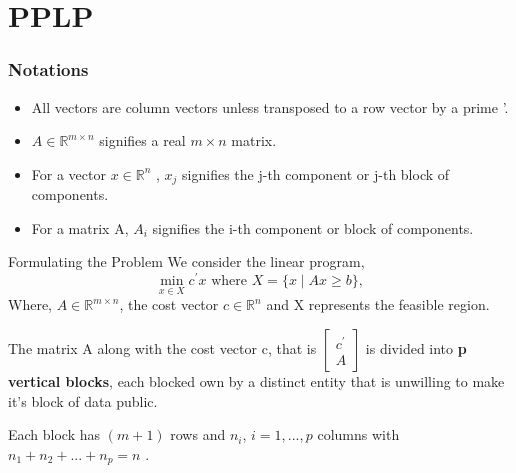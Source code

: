 \documentclass[9pt]{beamer}
\begin{document}
\section{PPLP}

\begin{frame}
\frametitle{Notations}
\begin{itemize}
    \item All vectors are column vectors unless transposed to a row vector by a prime '.
    
    \vspace{0.1cm}
    \item $ A \in \mathbb{R}^{m \times n} $ signifies a real $ m \times n $ matrix.
    
    \vspace{0.1cm}
    \item For a vector $ x \in \mathbb{R}^{n} $ , $ x_j $ signifies the j-th component or j-th block of components.
    
    \vspace{0.1cm}
    \item For a matrix A, $ A_i $ signifies the i-th component or block of components.
\end{itemize}
\end{frame}

\begin{frame}{Formulating the Problem}
We consider the linear program,
\begin{equation}
\min _{x \in X} c^{\prime} x \text { where } X=\{x \mid A x \geq b\},
\end{equation}
\vspace{0.1cm}
Where, $ A \in \mathbb{R}^{m \times n} $, the cost vector $ c \in \mathbb{R}^{n} $ and X represents the feasible region. \\
\vspace{0.3cm}

The matrix A along with the cost vector c, that is $
\left[\begin{array}{l}
c^{\prime} \\
A
\end{array}\right]
$ is divided into \textbf{p vertical blocks}, each blocked own by a distinct entity that is unwilling to make it's block of data public.\\
\vspace{0.2cm}

Each block has $ (m+1) $ rows and $ n_i $, $ i = 1,..., p $ columns with $ n_1 + n_2 + ... + n_p = n $ . 
\end{frame}
\end{document}
